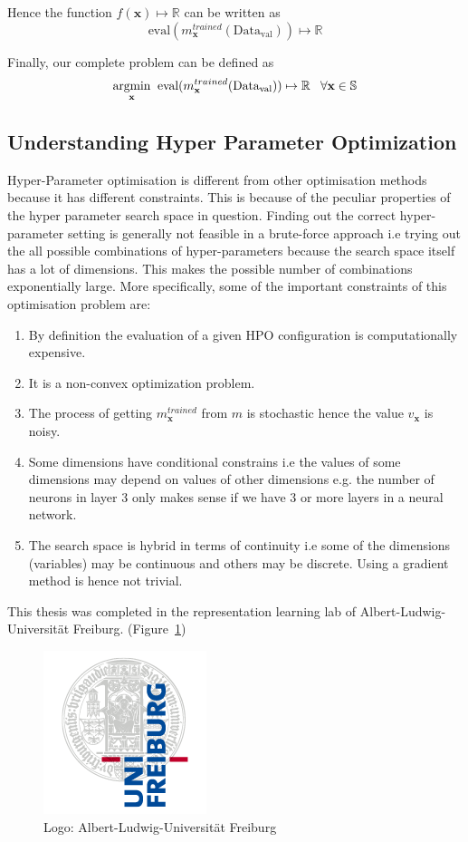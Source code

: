 \documentclass[11pt]{article}
\begin{document}
Hence the function $f(\textbf{x}) \mapsto \mathbb{R}$ can be written as 
$$
\textrm{eval}(m^{trained}_\textbf{x} (\textrm{Data}_\textrm{val})) \mapsto \mathbb{R}
$$

Finally,  our complete problem can be defined as
$$
\underset{\rm \textbf{x}}{\rm argmin} \;\; \textrm{eval}(m^{trained}_\textbf{x} (\textrm{Data}_\textrm{val})) \mapsto \mathbb{R}   \;\;\;  \forall \textbf{x} \in \mathbb{S}
$$

\label{ProblemOverviewlabel}
\subsection{Understanding Hyper Parameter Optimization}

Hyper-Parameter optimisation is different from other optimisation methods because it has different constraints.
This is because of the peculiar properties of the hyper parameter search space in question.
Finding out the correct hyper-parameter setting is generally not feasible in a brute-force approach i.e trying out the all possible combinations of hyper-parameters because the search space itself has a lot of dimensions. 
This makes the possible number of combinations exponentially large.
More specifically,  some of the important constraints of this optimisation problem are:

\begin{enumerate}
\item By definition the evaluation of a given HPO configuration is computationally expensive.
\item It is a non-convex optimization problem.
\item The process of getting $m^{trained}_\textbf{x}$ from $m$ is stochastic hence the value $v_{\textbf{x}}$ is noisy.
\item Some dimensions have conditional constrains i.e the values of some dimensions may depend on values of other dimensions e.g.  the number of neurons in layer 3 only makes sense if we have 3 or more layers in a neural network.
\item The search space is hybrid in terms of continuity i.e some of the dimensions (variables) may be continuous and others may be discrete.
Using a gradient method is hence not trivial.
\end{enumerate}

This thesis was completed in the representation learning lab of Albert-Ludwig-Universität Freiburg.  (Figure~\ref{fig:UniLogo})

\begin{figure}[htb]
  \centering
    \includegraphics[scale=0.35]{images/logo}
    \caption{Logo: Albert-Ludwig-Universität Freiburg}
    \label{fig:UniLogo}
\end{figure}
\end{document}
